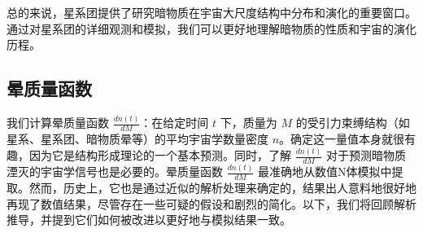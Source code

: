 总的来说，星系团提供了研究暗物质在宇宙大尺度结构中分布和演化的重要窗口。通过对星系团的详细观测和模拟，我们可以更好地理解暗物质的性质和宇宙的演化历程。 

\subsection{晕质量函数} 

我们计算晕质量函数 \( \frac{dn(t)}{dM} \)：在给定时间 \( t \) 下，质量为 \( M \) 的受引力束缚结构（如星系、星系团、暗物质晕等）的平均宇宙学数量密度 \( n \)。确定这一量值本身就很有趣，因为它是结构形成理论的一个基本预测。同时，了解 \( \frac{dn(t)}{dM} \) 对于预测暗物质湮灭的宇宙学信号也是必要的。晕质量函数 \( \frac{dn(t)}{dM} \) 最准确地从数值N体模拟中提取。然而，历史上，它也是通过近似的解析处理来确定的，结果出人意料地很好地再现了数值结果，尽管存在一些可疑的假设和剧烈的简化。以下，我们将回顾解析推导，并提到它们如何被改进以更好地与模拟结果一致。

